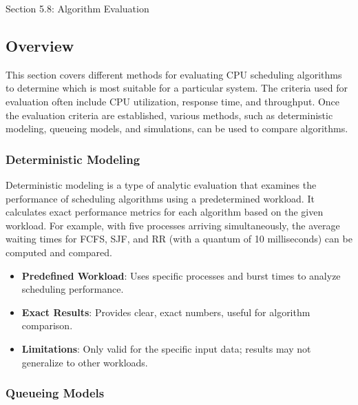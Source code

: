 \begin{notes}{Section 5.8: Algorithm Evaluation}
    \subsection*{Overview}

    This section covers different methods for evaluating CPU scheduling algorithms to determine which is most suitable for a particular system. The criteria used for evaluation often include 
    CPU utilization, response time, and throughput. Once the evaluation criteria are established, various methods, such as deterministic modeling, queueing models, and simulations, can be used 
    to compare algorithms.
    
    \subsubsection*{Deterministic Modeling}
    
    Deterministic modeling is a type of analytic evaluation that examines the performance of scheduling algorithms using a predetermined workload. It calculates exact performance metrics for each 
    algorithm based on the given workload. For example, with five processes arriving simultaneously, the average waiting times for FCFS, SJF, and RR (with a quantum of 10 milliseconds) can be 
    computed and compared.
    
    \begin{highlight}
    
        \begin{itemize}
            \item \textbf{Predefined Workload}: Uses specific processes and burst times to analyze scheduling performance.
            \item \textbf{Exact Results}: Provides clear, exact numbers, useful for algorithm comparison.
            \item \textbf{Limitations}: Only valid for the specific input data; results may not generalize to other workloads.
        \end{itemize}
    
    \end{highlight}
    
    \subsubsection*{Queueing Models}
    

\end{notes}
